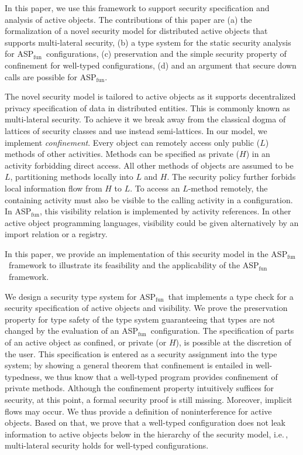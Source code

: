 \documentclass[10pt, conference, compsocconf]{IEEEtran}
\newcommand\aspfun{ASP${}_\text{fun}$\ }
\newcommand\aspfunp{ASP${}_\text{fun}$}
\newcommand\ie{i.e.\!\,, }
\begin{document}
In this paper, we use this framework to support security specification and analysis of
active objects.
The contributions of this paper are 
(a) the formalization of a novel security model for distributed active objects 
    that supports multi-lateral security,
(b) a type system for the static security analysis for \aspfun configurations,
(c) preservation and the simple security property of confinement for well-typed configurations,
(d) and an argument that secure down calls are possible for \aspfunp.

The novel security model \cite{kam:12} is tailored to active objects as it supports
decentralized privacy specification of data in distributed entities.
This is commonly known as multi-lateral security. To achieve it we break away from 
the classical dogma of lattices of security classes and use instead semi-lattices. 
In our model, we implement {\it confinement}.
Every object can remotely access only public ($L$) methods of other activities. 
Methods can be specified as private ($H$) in an activity forbidding direct access.
All other methods of objects are assumed to be $L$, partitioning methods 
locally into $L$ and $H$. 
The security policy further forbids local information flow from $H$ to $L$.
To access an $L$-method remotely,
the containing activity must also be visible to the calling activity in a configuration.
In \aspfunp, this visibility relation is implemented by activity references.
In other active object programming languages, visibility could be given
alternatively by an import relation or a registry. 


In this paper, we provide an implementation of this security model in the \aspfun framework to 
illustrate its feasibility and the applicability of the \aspfun framework.

We design a security type system for \aspfun that implements a type check for a
security specification of active objects and visibility.
We prove the preservation property for type safety of the type system guaranteeing that
types are not changed by the evaluation of an \aspfun configuration.
The specification of parts of an active object as confined, or private (or $H$), 
is possible at the discretion of the user. This specification is entered as a security 
assignment into the type system;
by showing a general theorem that confinement is entailed in well-typedness, 
we thus know that a well-typed program provides confinement of private methods.
Although the confinement property intuitively suffices for security, at this point, a 
formal security proof is still missing. Moreover, implicit flows may occur.
We thus provide a definition of noninterference for active objects. Based on that, we prove 
that a well-typed configuration does not leak information to active objects below 
in the hierarchy of the security model, \ie multi-lateral security holds for well-typed 
configurations.
\end{document}
